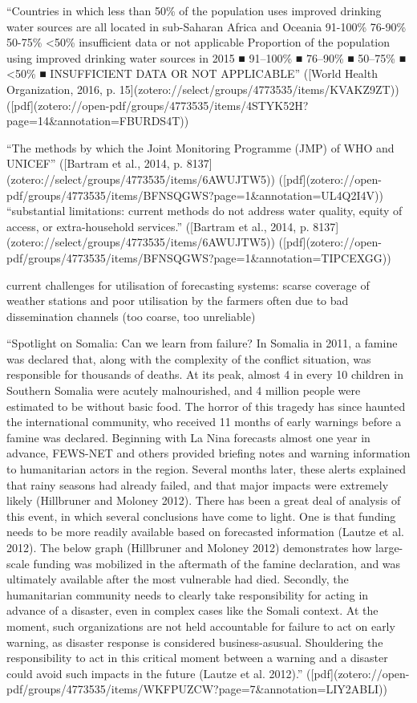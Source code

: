 “Countries in which less than 50\% of the population uses improved drinking water sources are all located in sub-Saharan Africa and Oceania 91-100\% 76-90\% 50-75\% <50\% insufficient data or not applicable Proportion of the population using improved drinking water sources in 2015 ■ 91–100\% ■ 76–90\% ■ 50–75\% ■ <50\% ■ INSUFFICIENT DATA OR NOT APPLICABLE” ([World Health Organization, 2016, p. 15](zotero://select/groups/4773535/items/KVAKZ9ZT)) ([pdf](zotero://open-pdf/groups/4773535/items/4STYK52H?page=14\&annotation=FBURDS4T))

“The methods by which the Joint Monitoring Programme (JMP) of WHO and UNICEF” ([Bartram et al., 2014, p. 8137](zotero://select/groups/4773535/items/6AWUJTW5)) ([pdf](zotero://open-pdf/groups/4773535/items/BFNSQGWS?page=1&annotation=UL4Q2I4V))
“substantial limitations: current methods do not address water quality, equity of access, or extra-household services.” ([Bartram et al., 2014, p. 8137](zotero://select/groups/4773535/items/6AWUJTW5)) ([pdf](zotero://open-pdf/groups/4773535/items/BFNSQGWS?page=1&annotation=TIPCEXGG))

current challenges for utilisation of forecasting systems: scarse coverage of weather stations and poor utilisation by the farmers often due to bad dissemination channels  (too coarse, too unreliable)






“Spotlight on Somalia: Can we learn from failure? In Somalia in 2011, a famine was declared that, along with the complexity of the conflict situation, was responsible for thousands of deaths. At its peak, almost 4 in every 10 children in Southern Somalia were acutely malnourished, and 4 million people were estimated to be without basic food. The horror of this tragedy has since haunted the international community, who received 11 months of early warnings before a famine was declared. Beginning with La Nina forecasts almost one year in advance, FEWS-NET and others provided briefing notes and warning information to humanitarian actors in the region. Several months later, these alerts explained that rainy seasons had already failed, and that major impacts were extremely likely (Hillbruner and Moloney 2012). There has been a great deal of analysis of this event, in which several conclusions have come to light. One is that funding needs to be more readily available based on forecasted information (Lautze et al. 2012). The below graph (Hillbruner and Moloney 2012) demonstrates how large-scale funding was mobilized in the aftermath of the famine declaration, and was ultimately available after the most vulnerable had died. Secondly, the humanitarian community needs to clearly take responsibility for acting in advance of a disaster, even in complex cases like the Somali context. At the moment, such organizations are not held accountable for failure to act on early warning, as disaster response is considered business-asusual. Shouldering the responsibility to act in this critical moment between a warning and a disaster could avoid such impacts in the future (Lautze et al. 2012).” ([pdf](zotero://open-pdf/groups/4773535/items/WKFPUZCW?page=7&annotation=LIY2ABLI))


